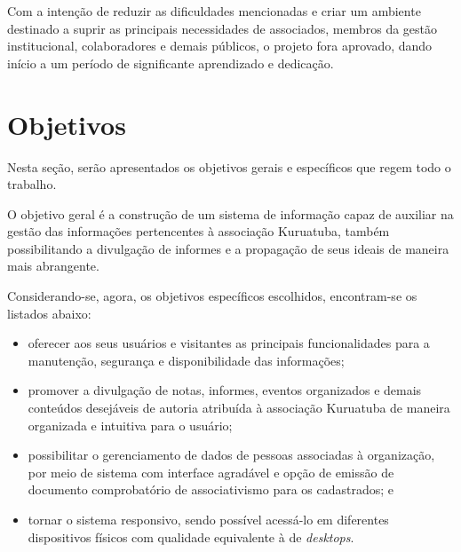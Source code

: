 Com a intenção de reduzir as dificuldades mencionadas e criar um ambiente destinado a suprir as principais necessidades de associados, membros da gestão institucional, colaboradores e demais públicos, o projeto fora aprovado, dando início a um período de significante aprendizado e dedicação.

\hspace{2.5cm}
\section{Objetivos}
\label{sec:telas}
\hspace{2.5cm}

Nesta seção, serão apresentados os objetivos gerais e específicos que regem todo o trabalho. 

O objetivo geral é a construção de um sistema de informação capaz de auxiliar na gestão das informações pertencentes à associação Kuruatuba, também possibilitando a divulgação de informes e a propagação de seus ideais de maneira mais abrangente.

Considerando-se, agora, os objetivos específicos escolhidos, encontram-se os listados abaixo:  
\begin{itemize}
 \item oferecer aos seus usuários e visitantes as principais funcionalidades para a manutenção, segurança e disponibilidade das informações;
 
 \item promover a divulgação de notas, informes, eventos organizados e demais conteúdos desejáveis de autoria atribuída à associação Kuruatuba de maneira organizada e intuitiva para o usuário;
  
 \item possibilitar o gerenciamento de dados de pessoas associadas à organização, por meio de sistema com interface agradável e opção de emissão de documento comprobatório de associativismo para os cadastrados; e
 
 \item tornar o sistema responsivo, sendo possível acessá-lo em diferentes dispositivos físicos com qualidade equivalente à de \textit{desktops}.  
\end{itemize}



